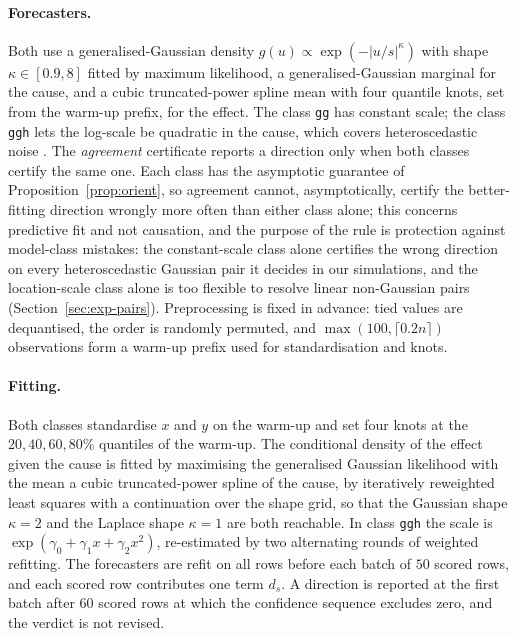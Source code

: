 \paragraph{Forecasters.} Both use a generalised-Gaussian density
$g(u)\propto\exp(-|u/s|^\kappa)$ with shape $\kappa\in[0.9,8]$ fitted by
maximum likelihood, a generalised-Gaussian marginal for the cause, and a
cubic truncated-power spline mean with four quantile knots, set from the
warm-up prefix, for the effect. The class \texttt{gg} has constant scale; the
class \texttt{ggh} lets the log-scale be quadratic in the cause, which covers
heteroscedastic noise
\citep{xu2022heci,immer2023loci}. The \emph{agreement} certificate reports a
direction only when both classes certify the same one. Each class has the
asymptotic guarantee of Proposition~\ref{prop:orient}, so agreement cannot, asymptotically,
certify the better-fitting direction wrongly more often than either class alone;
this concerns predictive fit and not causation, and the purpose of the rule is
protection against model-class mistakes: the
constant-scale class alone certifies the wrong direction on every
heteroscedastic Gaussian pair it decides in our simulations, and the location-scale class alone is too
flexible to resolve linear non-Gaussian pairs
(Section~\ref{sec:exp-pairs}). Preprocessing is fixed in advance: tied values
are dequantised, the order is randomly permuted, and $\max(100,\lceil0.2n\rceil)$
observations form a warm-up prefix used for standardisation and knots.


\paragraph{Fitting.} Both classes standardise $x$ and $y$ on the warm-up and set
four knots at the $20,40,60,80\%$ quantiles of the warm-up. The conditional
density of the effect given the cause is fitted by maximising the generalised
Gaussian likelihood with the mean a cubic truncated-power spline of the cause,
by iteratively reweighted least squares with a continuation over the shape
grid, so that the Gaussian shape $\kappa=2$ and the Laplace shape $\kappa=1$ are
both reachable. In class \texttt{ggh} the scale is $\exp(\gamma_0+\gamma_1x+\gamma_2x^2)$,
re-estimated by two alternating rounds of weighted refitting. The forecasters are
refit on all rows before each batch of $50$ scored rows, and each scored row
contributes one term $d_s$. A direction is reported at the first batch after
$60$ scored rows at which the confidence sequence excludes zero, and the
verdict is not revised.

